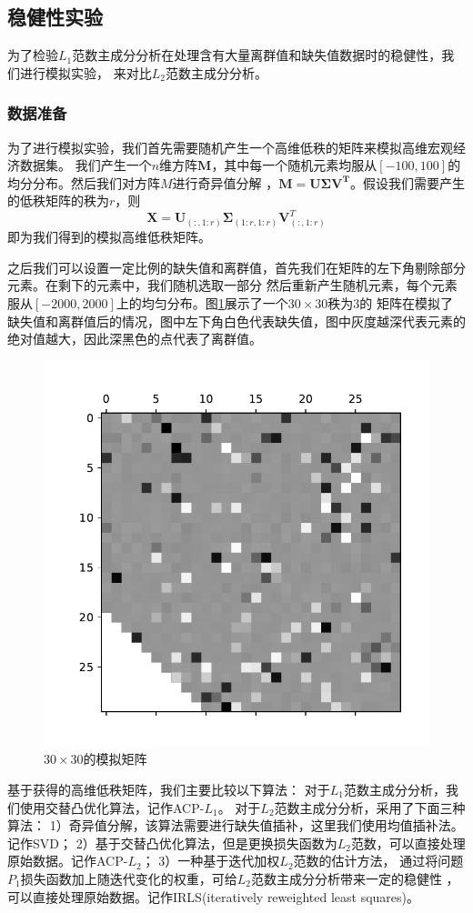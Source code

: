 \subsection{稳健性实验}\label{lab-1}
为了检验$L_1$范数主成分分析在处理含有大量离群值和缺失值数据时的稳健性，我们进行模拟实验，
来对比$L_2$范数主成分分析。

\subsubsection{数据准备}
为了进行模拟实验，我们首先需要随机产生一个高维低秩的矩阵来模拟高维宏观经济数据集。
我们产生一个$n$维方阵$\bm M$，其中每一个随机元素均服从$[-100, 100]$的均分分布。然后我们对方阵$M$进行奇异值分解
，$\bm M = \bm U\bm\Sigma \bm V^{\bm T}$。假设我们需要产生的低秩矩阵的秩为$r$，则$$\bm X = \bm 
U_{(:,1:r)}\bm \Sigma_{(1:r,1:r)}\bm V^T_{(:,1:r)}$$
即为我们得到的模拟高维低秩矩阵。

之后我们可以设置一定比例的缺失值和离群值，首先我们在矩阵的左下角剔除部分元素。在剩下的元素中，我们随机选取一部分
然后重新产生随机元素，每个元素服从$[-2000,2000]$上的均匀分布。图\ref{fig2.1}展示了一个$30\times30$秩为3的
矩阵在模拟了缺失值和离群值后的情况，图中左下角白色代表缺失值，图中灰度越深代表元素的绝对值越大，因此深黑色的点代表了离群值。

\begin{figure}[H]
    \centering
    \includegraphics[width=.5\textwidth]{pics/chapter2/matrix.pdf}
    \caption{\small $30\times30$的模拟矩阵}
    \label{fig2.1}
\end{figure}

基于获得的高维低秩矩阵，我们主要比较以下算法：
对于$L_1$范数主成分分析，我们使用交替凸优化算法，记作ACP-$L_1$。
对于$L_2$范数主成分分析，采用了下面三种算法：
1）奇异值分解，该算法需要进行缺失值插补，这里我们使用均值插补法。记作SVD；
2）基于交替凸优化算法，但是更换损失函数为$L_2$范数，可以直接处理原始数据。记作ACP-$L_2$；
3）一种基于迭代加权$L_2$范数的估计方法\cite{srebro2003weighted}，
通过将问题$P_1$损失函数加上随迭代变化的权重，可给$L_2$范数主成分分析带来一定的稳健性
，可以直接处理原始数据。记作IRLS(iteratively reweighted least squares)。

